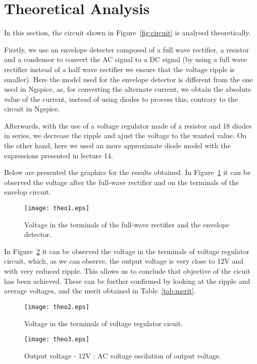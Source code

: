 \section{Theoretical Analysis}
\label{sec:analysis}
\tab In this section, the circuit shown in Figure~\ref{fig:circuit} is analysed theoretically.

Firstly, we use an envelope detecter composed of a full wave rectifier, a resistor and a condensor to convert the AC signal to a DC signal (by using a full wave rectifier instead of a half wave rectifier we ensure that the voltage ripple is smaller).
Here the model used for the envelope detector is different from the one used in Ngspice, as, for converting the alternate current, we obtain the absolute value of the current, instead of using diodes to process this, contrary to the circuit in Ngspice.

Afterwards, with the use of a voltage regulator made of a resistor and 18 diodes in series, we decrease the ripple and ajust the voltage to the wanted value. On the other hand, here we used an more approximate diode model with the expressions presented in lecture 14.

Below are presented the graphics for the results obtained. In Figure~\ref{fig:theo1} it can be observed the voltage after the full-wave rectifier and on the terminals of the envelop circuit.

\begin{figure}[H] \centering
\texttt{[image: theo1.eps]}
\caption{Voltage in the terminals of the full-wave rectifier and the envelope detector.}
\label{fig:theo1}
\end{figure}

In Figure~\ref{fig:theo2} it can be observed the voltage in the terminals of voltage regulator circuit, which, as we can observe, the output voltage is very close to 12V and with very reduced ripple. This allows us to conclude that objective of the cicuit has been achieved. These can be further confirmed by looking at the ripple and average voltages, and the merit obtained in Table~\ref{tab:merit}.

\begin{figure}[H] \centering
\texttt{[image: theo2.eps]}
\caption{Voltage in the terminals of voltage regulator cicuit.}
\label{fig:theo2}
\end{figure}

\begin{figure}[H] \centering
\texttt{[image: theo3.eps]}
\caption{Output voltage - 12V : AC voltage oscilation of output voltage.}
\label{fig:theo3}
\end{figure}

